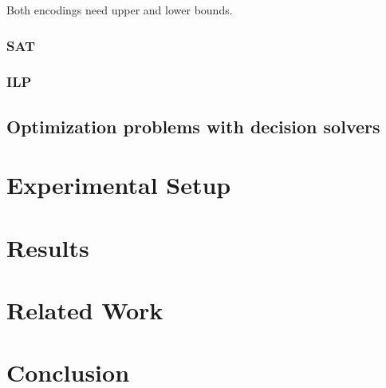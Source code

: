 \documentclass{sig-alternate}
\begin{document}
Both encodings need upper and lower bounds.

\subsubsection*{SAT}
\subsubsection*{ILP}

\subsection{Optimization problems with decision solvers}
\label{subsec:OptToDec}

\section{Experimental Setup}

\section{Results}

\section{Related Work}

\cite{alves2013resource}
\cite{abio2014encoding}
\cite{wu2013exploiting}
\cite{velev2009exploiting}
\cite{horbach2010boolean}
\cite{klein1999computing}
\cite{mingozzi1998exact}
\cite{sharma2011polynomial}
\cite{ramani2004breaking}
\cite{schutt2011explaining}
\cite{wille2008using}
\cite{malaguti2010survey}
\cite{cs395tGCtoSAT}

\section{Conclusion}



\end{document}
